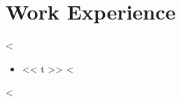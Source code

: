 \section{Work Experience}

<%
\begin{position}
\end{position}
\begin{itemize}[style=sameline,
                    itemsep=1pt,
                    parsep=0pt,
                    topsep=2pt,
                    partopsep=2pt,
                    leftmargin=10mm]
    <%
    \item << t >>
    <%
\end{itemize}
<%
